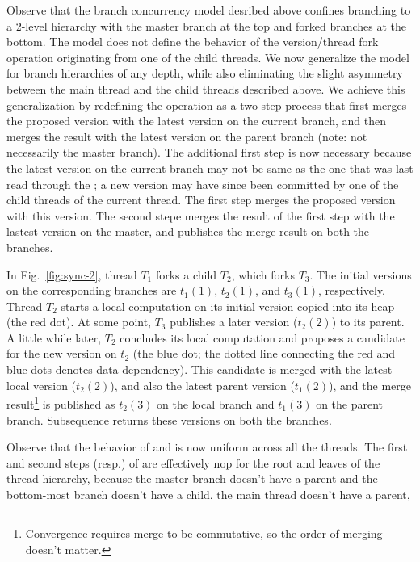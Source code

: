 Observe that the branch concurrency model desribed above confines
branching to a 2-level hierarchy with the master branch at the top and
forked branches at the bottom. The model does not define the behavior
of the version/thread fork operation originating from one of the child
threads. We now generalize the model for branch hierarchies of any
depth, while also eliminating the slight asymmetry between the main
thread and the child threads described above. We achieve this
generalization by redefining the  operation as
a two-step process that first merges the proposed version with the
latest version on the current branch, and then merges the result with
the latest version on the parent branch (note: not necessarily the
master branch). The additional first step is now necessary because the
latest version on the current branch may not be same as the one that
was last read through the ; a new version may
have since been committed by one of the child threads of the current
thread. The first step merges the proposed version with this version.
The second stepe merges the result of the first step with the lastest
version on the master, and publishes the merge result on both the
branches.

In Fig.~\ref{fig:sync-2}, thread $T_1$ forks a child $T_2$, which
forks $T_3$. The initial versions on the corresponding branches are
$t_1(1)$, $t_2(1)$, and $t_3(1)$, respectively. Thread $T_2$ starts a
local computation on its initial version copied into its heap (the red
dot). At some point, $T_3$ publishes a later version ($t_2(2)$) to its
parent. A little while later, $T_2$ concludes its local computation
and proposes a candidate for the new version on $t_2$ (the blue dot;
the dotted line connecting the red and blue dots denotes data
dependency). This candidate is merged with the latest local version
($t_2(2)$), and also the latest parent version ($t_1(2)$), and the
merge result\footnote{Convergence requires merge to be commutative, so
the order of merging doesn't matter.} is published as $t_2(3)$ on the
local branch and $t_1(3)$ on the parent branch. Subsequence
 returns these versions on both the branches.

Observe that the behavior of  and
 is now uniform across all the threads. The
first and second steps (resp.) of  are
effectively nop for the root and leaves of the thread hierarchy,
because the master branch doesn't have a parent and the bottom-most
branch doesn't have a child.
the main thread doesn't have a parent,

